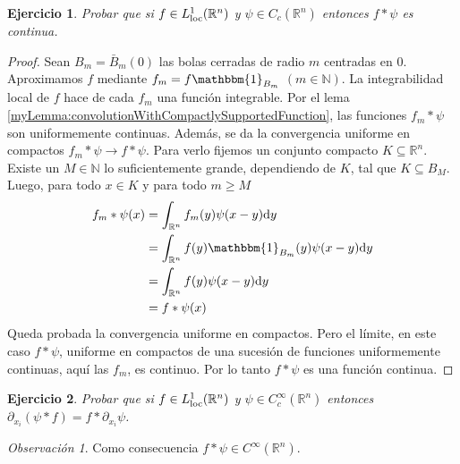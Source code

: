 \documentclass{article}
\newcommand{\characteristic}{\mathbbm{1}}
\newcommand{\naturalNumbers}{\mathbb{N}}
\newcommand{\realNumbers}{\mathbb{R}}
\newcommand{\locallyIntegrableFunctions}{L^1_{\textnormal{loc}}(\realNumbers^n)}
\newcommand{\local}{\textnormal{loc}}
\newtheorem{exercise}{Ejercicio}
\theoremstyle{remark}
\newtheorem{remark}{Observación}
\begin{document}
\begin{exercise}
  \label{exercise:continuousConvolutions}
  Probar que si \(f \in L^1_{\local}(\realNumbers^n)\) y \(\psi \in C_c(\realNumbers^n)\) entonces \(f * \psi\) es continua.
\end{exercise}
\begin{proof}
  Sean \(B_m = \bar{B}_m(0)\) las bolas cerradas de radio \(m\) centradas en \(0\).
  Aproximamos \(f\) mediante \(f_m = f \characteristic_{B_m}\) \((m \in \naturalNumbers)\).
  La integrabilidad local de \(f\) hace de cada \(f_m\) una función integrable.
  Por el lema \ref{myLemma:convolutionWithCompactlySupportedFunction}, las funciones \(f_m * \psi\) son uniformemente continuas.
  Además, se da la convergencia uniforme en compactos \(f_m * \psi \rightarrow f * \psi\).
  Para verlo fijemos un conjunto compacto \(K \subseteq \realNumbers^n\).
  Existe un \(M \in \naturalNumbers\) lo suficientemente grande, dependiendo de \(K\), tal que \(K \subseteq B_M\).
  Luego, para todo \(x \in K\) y para todo \(m \geq M\)
  \begin{align}
    f_m * \psi (x)
    &=
    \int_{\realNumbers^n} f_m (y) \psi(x - y) \dd y
    \\
    &=
    \int_{\realNumbers^n} f (y) \characteristic_{B_m} (y) \psi(x - y) \dd y
    \\
    &=
    \int_{\realNumbers^n} f (y) \psi(x - y) \dd y
    \\
    &=
    f * \psi (x)
  \end{align}
  Queda probada la convergencia uniforme en compactos.
  Pero el límite, en este caso \(f * \psi\), uniforme en compactos de una sucesión de funciones uniformemente continuas, aquí las \(f_m\), es continuo.
  Por lo tanto \(f * \psi\) es una función continua.
\end{proof}

\begin{exercise}
  \label{exercise:convolutionDerivative}
  Probar que si \(f \in \locallyIntegrableFunctions\) y \(\psi \in C^{\infty}_c(\realNumbers^n)\) entonces \(\partial_{x_i} (\psi * f) = f * \partial_{x_i} \psi\).
\end{exercise}
\begin{remark}
  \label{remark:smoothConvolutions}
  Como consecuencia \(f * \psi \in C^{\infty}(\realNumbers^n)\).
\end{remark}
\end{document}
